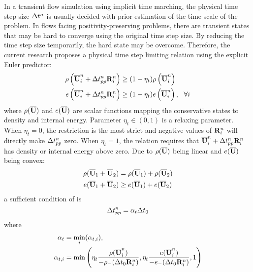 In a transient flow simulation using implicit
time marching, the
physical time step size $\mathrm\Delta t^n$
is usually decided with prior estimation
of the time scale of the problem.
In flows facing positivity-preserving problems,
there are transient states that may be hard
to converge using the original time step size.
By reducing the time step size temporarily,
the hard state may be overcome.
Therefore, the current research
proposes a physical time step limiting relation using
the explicit Euler predictor:
\begin{equation}
    \label{eq:ppLimitDt}
    \begin{aligned}
        \rho\left(\overline{\mathbf{U}}_i^n + \mathrm\Delta t^{n}_{pp}\mathbf{R}_i^n\right)
         & \geq
        (1- \eta_t)
        \rho\left(\overline{\mathbf{U}}_i^n\right) \\
        e\left(\overline{\mathbf{U}}_i^n + \mathrm\Delta t^{n}_{pp}\mathbf{R}_i^n\right)
         & \geq
        (1- \eta_t)
        e\left(\overline{\mathbf{U}}_i^n\right), \ \ \forall i
    \end{aligned}
\end{equation}
where $\rho(\overline{\mathbf{U}})$ and $e(\overline{\mathbf{U}})$ are scalar functions
mapping the conservative states to density and internal energy.
Parameter $\eta_t\in(0,1)$ is a relaxing parameter.
When $\eta_t=0$, the restriction is the most strict and
negative values of $\mathbf{R}_i^n$ will directly make $\mathrm\Delta t^n_{pp}$
zero.
When  $\eta_t=1$, the relation requires that $\overline{\mathbf{U}}_i^n + \mathrm\Delta t^{n}_{pp}\mathbf{R}_i^n$
has density or internal energy above zero.
Due to $\rho(\overline{\mathbf{U}})$ being linear and $e(\overline{\mathbf{U}})$ being convex:
\begin{equation}
    \begin{aligned}
        \rho(\overline{\mathbf{U}}_1 + \overline{\mathbf{U}}_2) & = \rho(\overline{\mathbf{U}}_1) + \rho(\overline{\mathbf{U}}_2) \\
        e(\overline{\mathbf{U}}_1 + \overline{\mathbf{U}}_2)    & \geq e(\overline{\mathbf{U}}_1) + e(\overline{\mathbf{U}}_2)    \\
    \end{aligned}
\end{equation}
a sufficient condition of  is
\begin{equation}
    \mathrm\Delta t^n_{pp} = \alpha_t \mathrm\Delta t_0 
\end{equation}
where
\begin{equation}
    \begin{aligned}
        \alpha_t     & = \min_i(\alpha_{t,i}), \\
        \alpha_{t,i} & = \min\left(
        \eta_t\frac{\rho(\overline{\mathbf{U}}_i^n)}{-\rho_-(\mathrm\Delta t_0 \mathbf{R}_i^n)},
        \eta_t\frac{e(\overline{\mathbf{U}}_i^n)}{-e_-(\mathrm\Delta t_0 \mathbf{R}_i^n)},
        1
        \right)
    \end{aligned}
\end{equation}
